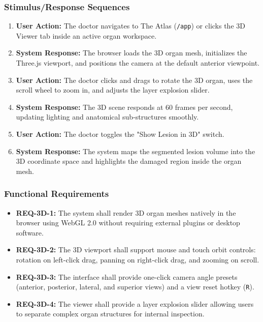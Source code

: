 \documentclass[12pt,a4paper]{report}
\begin{document}
\subsubsection{Stimulus/Response Sequences}
\begin{enumerate}
    \item \textbf{User Action:} The doctor navigates to The Atlas (\texttt{/app}) or clicks the 3D Viewer tab inside an active organ workspace.
    \item \textbf{System Response:} The browser loads the 3D organ mesh, initializes the Three.js viewport, and positions the camera at the default anterior viewpoint.
    \item \textbf{User Action:} The doctor clicks and drags to rotate the 3D organ, uses the scroll wheel to zoom in, and adjusts the layer explosion slider.
    \item \textbf{System Response:} The 3D scene responds at 60 frames per second, updating lighting and anatomical sub-structures smoothly.
    \item \textbf{User Action:} The doctor toggles the "Show Lesion in 3D" switch.
    \item \textbf{System Response:} The system maps the segmented lesion volume into the 3D coordinate space and highlights the damaged region inside the organ mesh.
\end{enumerate}

\subsubsection{Functional Requirements}
\begin{itemize}
    \item \textbf{REQ-3D-1:} The system shall render 3D organ meshes natively in the browser using WebGL 2.0 without requiring external plugins or desktop software.
    \item \textbf{REQ-3D-2:} The 3D viewport shall support mouse and touch orbit controls: rotation on left-click drag, panning on right-click drag, and zooming on scroll.
    \item \textbf{REQ-3D-3:} The interface shall provide one-click camera angle presets (anterior, posterior, lateral, and superior views) and a view reset hotkey (\texttt{R}).
    \item \textbf{REQ-3D-4:} The viewer shall provide a layer explosion slider allowing users to separate complex organ structures for internal inspection.
\end{itemize}
\end{document}
